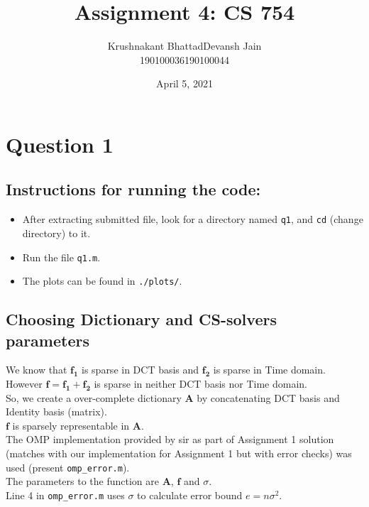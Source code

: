 \documentclass[fleqn, 11pt]{article}
\title{Assignment 4: CS 754}
\author{ 
\begin{tabular}{|c|c|}
     \hline
     \textsf{Krushnakant Bhattad} & \textsf{Devansh Jain} \\
     \hline
     \textsf{190100036} & \textsf{190100044}\\
     \hline
\end{tabular}
}
\date{April 5, 2021}
\begin{document}
\maketitle
\tableofcontents
\thispagestyle{empty}
\setcounter{page}{0}

\newpage
\section*{Question 1}
\setcounter{equation}{0}

\subsection*{Instructions for running the code:}
\begin{itemize}[noitemsep]
    \item After extracting submitted file, look for a directory named \texttt{q1}, and \texttt{cd} (change directory) to it.
    \item Run the file \texttt{q1.m}.
    \item The plots can be found in \texttt{./plots/}.
\end{itemize}

\bigskip

\subsection*{Choosing Dictionary and CS-solvers parameters}
We know that $\boldsymbol{f_1}$ is sparse in DCT basis and $\boldsymbol{f_2}$ is sparse in Time domain. \\
However $\boldsymbol{f} = \boldsymbol{f_1} + \boldsymbol{f_2}$ is sparse in neither DCT basis nor Time domain. \\
So, we create a over-complete dictionary $\boldsymbol{A}$ by concatenating DCT basis and Identity basis (matrix). \\
$\boldsymbol{f}$ is sparsely representable in $\boldsymbol{A}$.\\

The OMP implementation provided by sir as part of Assignment 1 solution (matches with our implementation for Assignment 1 but with error checks) was used (present \texttt{omp\_error.m}). \\
The parameters to the function are $\boldsymbol{A}$, $\boldsymbol{f}$ and $\sigma$. \\
Line 4 in \texttt{omp\_error.m} uses $\sigma$ to calculate error bound $e = n \sigma^2$. \\
\end{document}
